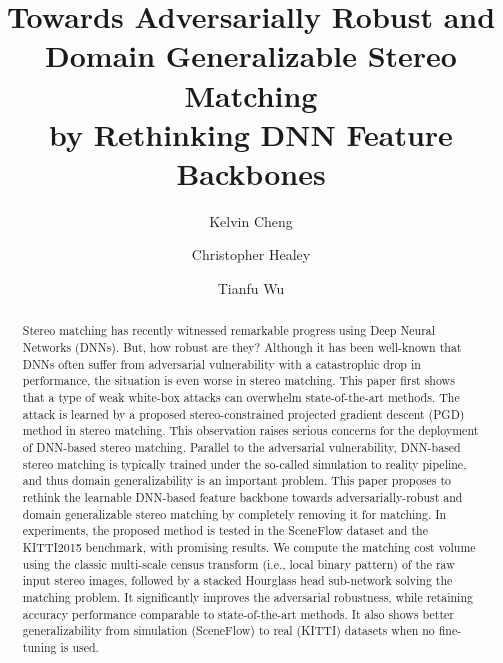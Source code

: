 \documentclass[10pt,twocolumn,letterpaper]{article}
\begin{document}
\title{Towards Adversarially Robust and Domain Generalizable Stereo Matching \\by Rethinking DNN Feature Backbones}

\author{Kelvin Cheng}
\author{Christopher Healey}
\author{Tianfu Wu}

\makeatletter
\let\@oldmaketitle\@maketitle%
\renewcommand{\@maketitle}{\@oldmaketitle%
  \texttt{[image: figures/teaser\_v2.pdf]}\captionof{figure}{Examples of attacking stereo matching in the KITTI2015~\cite{Menze2015CVPR} dataset. GANet-Deep~\cite{GANet} results on the top row, our results on the bottom row. The attack is based on the proposed stereo-constrained projected gradient descent (PGD) attack within a patch, which by design preserves the photometric consistency of non-occluded regions. One of the state-of-the-art methods, GANet-Deep shows a significant drop in performance (the last column), while the proposed method shows much stronger resistance to the attack. \label{fig:teaser}}\bigskip}
\makeatother

\maketitle
\ificcvfinal\thispagestyle{empty}\fi

\begin{abstract}
Stereo matching has recently witnessed remarkable progress using Deep Neural Networks (DNNs). But, how robust are they? Although it has been well-known that DNNs often suffer from adversarial vulnerability with a catastrophic drop in performance, the situation is even worse in stereo matching. 
This paper first shows that a type of weak white-box attacks can overwhelm state-of-the-art methods. The attack is learned by a proposed stereo-constrained projected gradient descent (PGD) method in stereo matching.
This observation raises serious concerns for the deployment of DNN-based stereo matching. 
Parallel to the adversarial vulnerability, DNN-based stereo matching is typically trained under the so-called simulation to reality pipeline, and thus domain generalizability is an important problem.
This paper proposes to rethink the learnable DNN-based feature backbone towards adversarially-robust and domain generalizable stereo matching by completely removing it for matching. In experiments, the proposed method is tested in the SceneFlow dataset and the KITTI2015 benchmark, with promising results. We compute the matching cost volume using the classic multi-scale census transform (i.e., local binary pattern) of the raw input stereo images, followed by a stacked Hourglass head sub-network solving the matching problem. It significantly improves the adversarial robustness, while retaining accuracy performance comparable to state-of-the-art methods. It also shows better generalizability from simulation (SceneFlow) to real (KITTI) datasets when no fine-tuning is used. 
\end{abstract}
\end{document}
